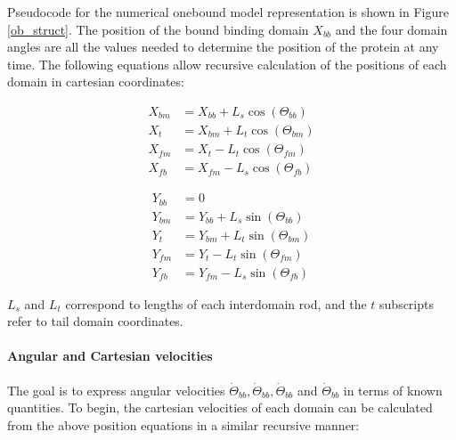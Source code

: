 \documentclass[10pt]{article} %
\begin{document}
Pseudocode for the numerical onebound model representation is shown in Figure \ref{ob_struct}. The position of the bound binding domain $X_{bb}$ and the four domain angles are all the values needed to determine the position of the protein at any time. The following equations allow recursive calculation of the positions of each domain in cartesian coordinates:

\noindent\begin{minipage}{0.49\linewidth}
\begin{align}
  X_{bm} &= X_{bb}+L_{s}\cos(\Theta_{bb}) \\
  X_{t}  &= X_{bm}+L_{t}\cos(\Theta_{bm}) \\
  X_{fm} &= X_{t} - L_{t}\cos(\Theta_{fm}) \\
  X_{fb} &= X_{fm} - L_{s}\cos(\Theta_{fb})
\end{align}
\end{minipage}
\begin{minipage}{0.49\linewidth}
\begin{align}
  Y_{bb} &= 0 \\
  Y_{bm} &= Y_{bb}+L_{s}\sin(\Theta_{bb}) \\
  Y_{t}  &= Y_{bm}+L_{t}\sin(\Theta_{bm}) \\
  Y_{fm} &= Y_{t} - L_{t}\sin(\Theta_{fm}) \\
  Y_{fb} &= Y_{fm} - L_{s}\sin(\Theta_{fb})
\end{align}
\end{minipage}
\vspace{.5cm}

$L_s$ and $L_t$ correspond to lengths of each interdomain rod, and the $t$ subscripts refer to tail domain coordinates.\\

\paragraph{Angular and Cartesian velocities}
The goal is to express angular velocities $\dot{\Theta}_{bb}, \dot{\Theta}_{bb}, \dot{\Theta}_{bb}$ and $\dot{\Theta}_{bb}$ in terms of known quantities. To begin, the cartesian velocities of each domain can be calculated from the above position equations in a similar recursive manner:
\end{document}

